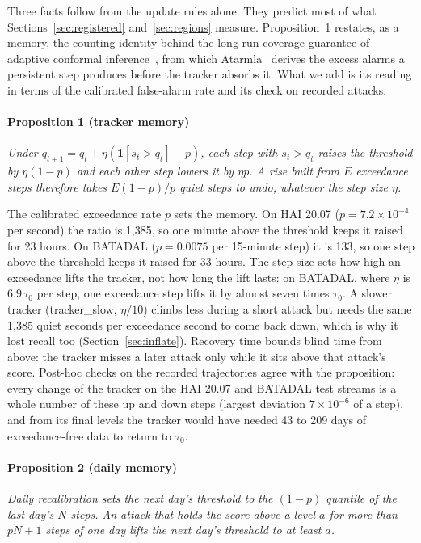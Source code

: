 \documentclass[letterpaper,twocolumn,10pt]{article}
\begin{document}
Three facts follow from the update rules alone. They predict most of what
Sections~\ref{sec:registered} and~\ref{sec:regions} measure. Proposition~1 restates, as a
memory, the counting identity behind the long-run coverage guarantee of adaptive conformal
inference~\cite{gibbs2021aci}, from which Atarmla~\cite{atarmla2026price} derives the excess alarms a
persistent step produces before the tracker absorbs it. What we add is its reading in terms of the
calibrated false-alarm rate and its check on recorded attacks.

\paragraph{Proposition 1 (tracker memory)} \emph{Under $q_{t+1} = q_t + \eta(\mathbf{1}[s_t > q_t]
- p)$, each step with $s_t > q_t$ raises the threshold by $\eta(1-p)$ and each other step lowers it
by $\eta p$. A rise built from $E$ exceedance steps therefore takes $E(1-p)/p$ quiet steps to undo,
whatever the step size $\eta$.}

The calibrated exceedance rate $p$ sets the memory. On HAI 20.07 ($p = 7.2 \times 10^{-4}$ per
second) the ratio is 1,385, so one minute above the threshold keeps it raised for 23 hours. On
BATADAL ($p = 0.0075$ per 15-minute step) it is 133, so one step above the threshold keeps it raised
for 33 hours. The step size sets how high an exceedance lifts the tracker, not how long the lift
lasts: on BATADAL, where $\eta$ is $6.9\,\tau_0$ per step, one exceedance step lifts it by almost seven
times $\tau_0$. A slower tracker (tracker\_slow, $\eta/10$) climbs less during a short attack but needs
the same 1,385 quiet seconds per exceedance second to come back down, which is why it lost recall too
(Section~\ref{sec:inflate}). Recovery time bounds blind time from above: the tracker misses a later
attack only while it sits above that attack's score. Post-hoc checks on the recorded trajectories
agree with the proposition: every change of the tracker on the HAI 20.07 and BATADAL test streams is
a whole number of these up and down steps (largest deviation $7 \times 10^{-6}$ of a step), and from its final levels the tracker would have needed 43 to 209 days of exceedance-free data to return
to $\tau_0$.

\paragraph{Proposition 2 (daily memory)} \emph{Daily recalibration sets the next day's threshold to
the $(1-p)$ quantile of the last day's $N$ steps. An attack that holds the score above a level $a$
for more than $pN + 1$ steps of one day lifts the next day's threshold to at least $a$.}
\end{document}
